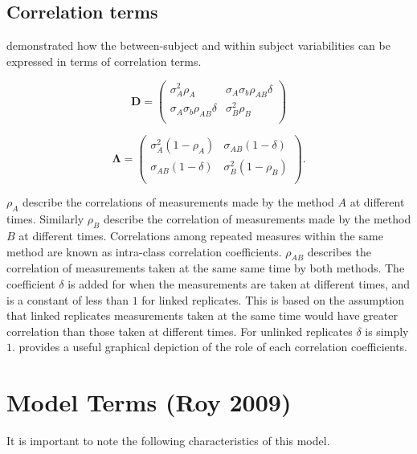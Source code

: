 \documentclass[12pt, a4paper]{report}
\theoremstyle{plain}
\theoremstyle{definition}
\theoremstyle{remark}
\begin{document}
	\subsection{Correlation terms}
	\citet{hamlett} demonstrated how the between-subject and within subject variabilities can be expressed in terms of
	correlation terms.
	
	\[
	\boldsymbol{D} = \left( \begin{array}{cc}
	\sigma^2_{A}\rho_{A} & \sigma_{A}\sigma_{b}\rho_{AB}\delta \\
	\sigma_{A}\sigma_{b}\rho_{AB}\delta & \sigma^2_{B}\rho_{B}\\
	
	\end{array}\right)
	\]
	
	\[
	\boldsymbol{\Lambda} = \left(
	\begin{array}{cc}
	\sigma^2_{A}(1-\rho_{A}) & \sigma_{AB}(1-\delta)  \\
	\sigma_{AB}(1-\delta) & \sigma^2_{B}(1-\rho_{B}) \\
	\end{array}\right).
	\]
	
	$\rho_{A}$ describe the correlations of measurements made by the method $A$ at different times. Similarly $\rho_{B}$ describe the correlation of measurements made by the method $B$ at different times. Correlations among repeated measures within the same method are known as intra-class correlation coefficients. $\rho_{AB}$ describes the correlation of measurements taken at the same same time by both methods. The coefficient $\delta$ is added for when the measurements are taken at different times, and is a constant of less than $1$ for linked replicates. This is based on the assumption that linked replicates measurements taken at the same time would have greater correlation than those taken at different times. For unlinked replicates $\delta$ is simply $1$. \citet{hamlett} provides a useful graphical depiction of the role of each correlation coefficients.
	
	
	
	
	
	
	









\section{Model Terms (Roy 2009)}
It is important to note the following characteristics of this model.
\end{document}
